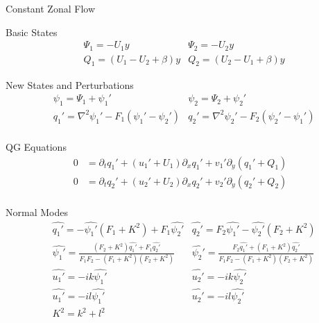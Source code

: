 \documentclass[12pt]{article}
\begin{document}
    \begin{section}{Constant Zonal Flow}
        \begin{subsection}{Basic States}
            \begin{align*}
                &\Psi_1 = -U_1 y
                &\Psi_2 = -U_2 y \\
                &Q_1 = (U_1 - U_2 + \beta) y
                &Q_2 = (U_2 - U_1 + \beta) y
            \end{align*}
        \end{subsection}

        \begin{subsection}{New States and Perturbations}
            \begin{align*}
                 &\psi_1 = \Psi_1 + \psi_1'
                 &\psi_2 = \Psi_2 + \psi_2' \\
                 &q_1' = \nabla^2\psi_1' - F_1(\psi_1' - \psi_2')
                 &q_2' = \nabla^2\psi_2' - F_2(\psi_2' - \psi_1') \\
            \end{align*}
        \end{subsection}

        \begin{subsection}{QG Equations}
            \begin{align*}
                 0 &= \partial_t q_1' + (u_1' + U_1)\partial_x q_1' + v_1' \partial_y(q_1' + Q_1) \\
                 0 &= \partial_t q_2' + (u_2' + U_2)\partial_x q_2' + v_2' \partial_y(q_2' + Q_2) \\
            \end{align*}
        \end{subsection}

        \begin{subsection}{Normal Modes}
            \begin{align*}
                 &\hat{q_1'} = -\hat{\psi_1'}(F_1 + K^2) + F_1\hat{\psi_2'}
                 &\hat{q_2'} = F_2\hat{\psi_1'} - \hat{\psi_2'}(F_2 + K^2) \\
                &\hat{\psi_1'} = \frac{(F_2 + K^2) \hat{q_1'} + F_1\hat{q_2'}}{F_1F_2 - (F_1 + K^2)(F_2 + K^2)}
                &\hat{\psi_2'} = \frac{F_2\hat{q_1'} + (F_1 + K^2)\hat{q_2'}}{F_1F_2 - (F_1 + K^2)(F_2 + K^2)} \\
                &\hat{u_1'} = -ik \hat{\psi_1'}
                &\hat{u_2'} = -ik \hat{\psi_2'} \\
                &\hat{u_1'} = -il \hat{\psi_1'}
                &\hat{u_2'} = -il \hat{\psi_2'} \\
                &K^2 = k^2 + l^2
            \end{align*}
        \end{subsection}
    \end{section}
\end{document}
